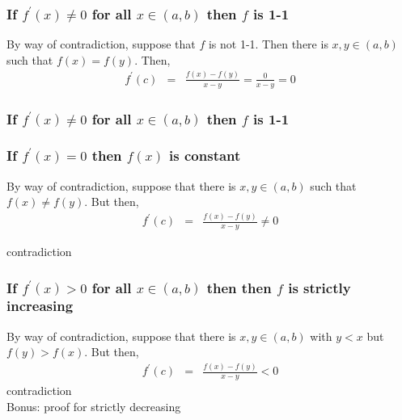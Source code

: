 \documentclass{beamer}
\numberwithin{equation}{section}
\begin{document}
\begin{frame}
\frametitle{If $f^{'}(x) \neq 0$ for all $x \in (a,b)$ then $f$ is 1-1}

By way of contradiction, suppose that $f$ is not 1-1.  Then there is $x, y \in (a,b)$ such that $f(x) = f(y)$.  Then, 
\begin{eqnarray}
f^{'}(c) & = & \frac{f(x) - f(y)}{x- y} = \frac{0}{x -y}  = 0 \nonumber 
\end{eqnarray}


\end{frame}

\begin{frame}
\frametitle{If $f^{'}(x) \neq 0$ for all $x \in (a,b)$ then $f$ is 1-1}



\pause 
{} 

\end{frame}

\begin{frame}
\frametitle{If $f^{'}(x) = 0$ then $f(x)$ is constant}

By way of contradiction, suppose that there is $x, y \in (a,b)$ such that $f(x) \neq f(y)$.  But then, 
\begin{eqnarray}
f^{'}(c)  & = & \frac{f(x) - f(y) } {x - y} \neq 0 \nonumber
\end{eqnarray}

\alert{contradiction}



\end{frame}

\begin{frame}
\frametitle{If $f^{'}(x)> 0$ for all $x \in (a,b)$ then then $f$ is strictly increasing}

By way of contradiction, suppose that there is $x, y \in (a,b)$ with $y<x$ but $f(y)>f(x)$.  But then, 
\begin{eqnarray}
f^{'}(c) & = & \frac{f(x) - f(y) }{x - y } < 0 \nonumber 
\end{eqnarray}
\alert{contradiction}\\

\alert{Bonus: proof for strictly decreasing}


\end{frame}
\end{document}
